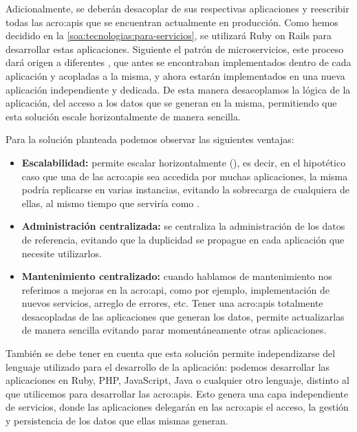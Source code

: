 Adicionalmente, se deberán desacoplar de sus respectivas aplicaciones y reescribir todas las \glspl{acro:api} que se encuentran actualmente en producción. Como hemos decidido en la \autoref{soa:tecnologias:para-servicios}, se utilizará Ruby on Rails para desarrollar estas aplicaciones. Siguiente el patrón de microservicios, este proceso dará origen a diferentes , que antes se encontraban implementados dentro de cada aplicación y acopladas a la misma, y ahora estarán implementados en una nueva aplicación independiente y dedicada.  De esta manera desacoplamos la lógica de la aplicación, del acceso a los datos que se generan en la misma, permitiendo que esta solución escale horizontalmente de manera sencilla.

Para la solución planteada podemos observar las siguientes ventajas:

\begin{itemize}
  \item \textbf{Escalabilidad:} permite escalar horizontalmente (), es decir, en el hipotético caso que una de las \glspl{acro:api} sea accedida por muchas aplicaciones, la misma podría replicarse en varias instancias, evitando la sobrecarga de cualquiera de ellas, al mismo tiempo que serviría como .

  \item \textbf{Administración centralizada:} se centraliza la administración de los datos de referencia, evitando que la duplicidad se propague en cada aplicación que necesite utilizarlos.

  \item \textbf{Mantenimiento centralizado:} cuando hablamos de mantenimiento nos referimos a mejoras en la \gls{acro:api}, como por ejemplo, implementación de nuevos servicios, arreglo de errores, etc. Tener una \glspl{acro:api} totalmente desacopladas de las aplicaciones que generan los datos, permite actualizarlas de manera sencilla evitando parar momentáneamente otras aplicaciones.
\end{itemize}

También se debe tener en cuenta que esta solución permite independizarse del lenguaje utilizado para el desarrollo de la aplicación: podemos desarrollar las aplicaciones en Ruby, PHP, JavaScript, Java o cualquier otro lenguaje, distinto al que utilicemos para desarrollar las \glspl{acro:api}. Esto genera una capa independiente de servicios, donde las aplicaciones delegarán en las \glspl{acro:api} el acceso, la gestión y persistencia de los datos que ellas mismas generan.

